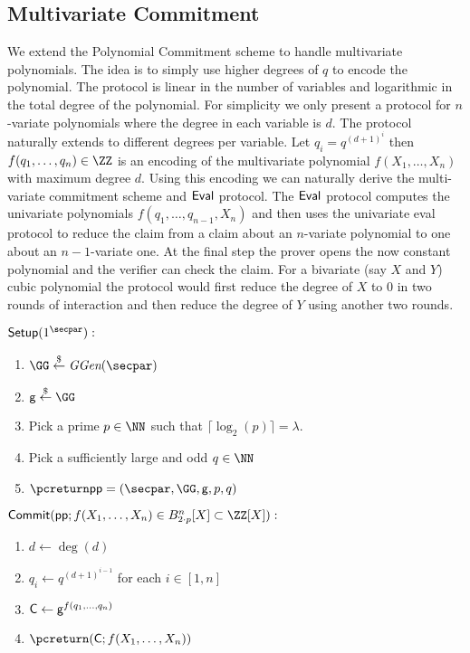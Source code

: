 \documentclass{article}
\theoremstyle{definition}
\begin{document}
\subsection{Multivariate Commitment}\label{section:multivariate}
  We extend the Polynomial Commitment scheme to handle multivariate polynomials. The idea is to simply use higher degrees of $q$ to encode the polynomial. The protocol is linear in the number of variables and logarithmic in the total degree of the polynomial. For simplicity we only present a protocol for $n$-variate polynomials where the degree in each variable is $d$. The protocol naturally extends to different degrees per variable.
Let $q_i=q^{(d+1)^i}$ then $f(q_1,\dots,q_n)\in \ZZ$ is an encoding of the multivariate polynomial $f(X_1,\dots,X_n)$ with maximum degree $d$. Using this encoding we can naturally derive the multi-variate commitment scheme and $\textsf{{Eval}}$ protocol. The $\textsf{{Eval}}$ protocol  computes the univariate polynomials $f(q_1,\dots,q_{n-1},X_n)$ and then uses the univariate eval protocol to reduce the claim from a claim about an $n$-variate polynomial to one about an $n-1$-variate one. At the final step the prover opens the now constant polynomial and the verifier can check the claim. For a bivariate (say $X$ and $Y$) cubic polynomial the protocol would first reduce the degree of $X$ to $0$ in two rounds of interaction and then reduce the degree of $Y$ using another two rounds.
 
 \begin{mdframed}[userdefinedwidth=\textwidth]
\begin{minipage}{\textwidth}
	\begin{flushleft}
	$\pro{Setup}(1^\secpar):$
		\begin{enumerate}[nolistsep]
			\item $ \GG \sample \ggen(\secpar)$
			\item $ \gr{g} \sample \GG$
			\item Pick a prime $p\in \NN$ such that $\lceil\log_2(p)\rceil=\lambda$.
			\item Pick a sufficiently large and odd $q\in \NN$
			\item $\pcreturn \params = (\secpar,\GG,\gr{g},p,q)$
		\end{enumerate}
	$\pro{Commit}(\crs;f(X_1,\dots,X_n) \in B_{2\cdot p}^n[X]\subset \ZZ[X]):$ 		\begin{enumerate}[nolistsep]
			\item $d\gets \deg(d)$
			\item $q_i\gets q^{(d+1)^{i-1}}$ for each $i\in [1,n]$
			\item $\mathsf{C} \gets \mathsf{g}^{f(q_1,\dots,q_n)}$
			\item $\pcreturn (\gr{C};f(X_1,\dots,X_n))$
		\end{enumerate}
			\end{flushleft}
\end{minipage}
\end{mdframed}
 
\end{document}
